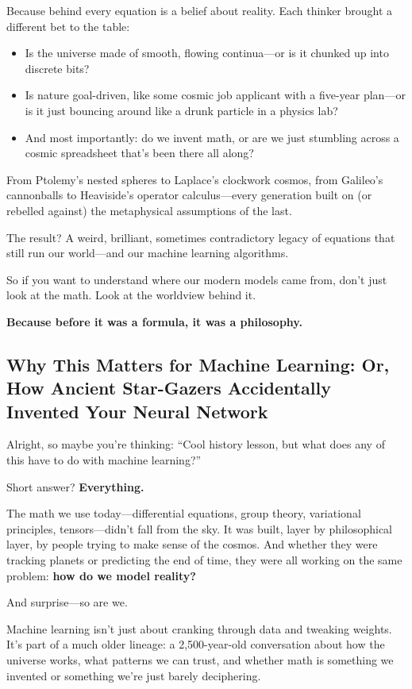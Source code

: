 Because behind every equation is a belief about reality. Each thinker brought a different bet to the table:
\begin{itemize}
    \item Is the universe made of smooth, flowing continua—or is it chunked up into discrete bits?
    \item Is nature goal-driven, like some cosmic job applicant with a five-year plan—or is it just bouncing around like a drunk particle in a physics lab?
    \item And most importantly: do we invent math, or are we just stumbling across a cosmic spreadsheet that’s been there all along?
\end{itemize}

From Ptolemy’s nested spheres to Laplace’s clockwork cosmos, from Galileo’s cannonballs to Heaviside’s operator calculus—every generation built on (or rebelled against) the metaphysical assumptions of the last.

The result? A weird, brilliant, sometimes contradictory legacy of equations that still run our world—and our machine learning algorithms.

So if you want to understand where our modern models came from, don’t just look at the math. Look at the worldview behind it.

\textbf{Because before it was a formula, it was a philosophy.}


\subsection{Why This Matters for Machine Learning: Or, How Ancient Star-Gazers Accidentally Invented Your Neural Network}

Alright, so maybe you’re thinking: “Cool history lesson, but what does any of this have to do with machine learning?” 

Short answer? \textbf{Everything.}

The math we use today—differential equations, group theory, variational principles, tensors—didn’t fall from the sky. It was built, layer by philosophical layer, by people trying to make sense of the cosmos. And whether they were tracking planets or predicting the end of time, they were all working on the same problem: \textbf{how do we model reality?}

And surprise—so are we.

Machine learning isn’t just about cranking through data and tweaking weights. It’s part of a much older lineage: a 2,500-year-old conversation about how the universe works, what patterns we can trust, and whether math is something we invented or something we’re just barely deciphering.

